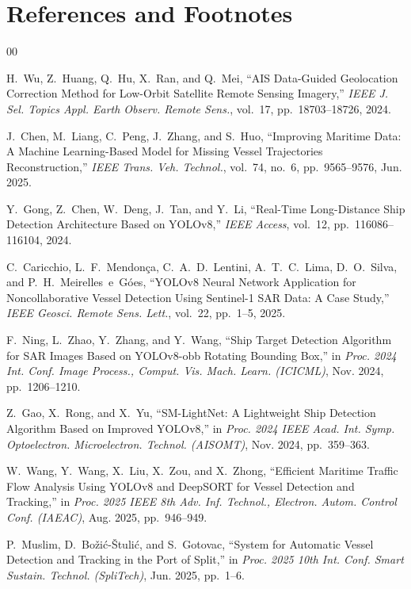 \documentclass{ieeeaccess}
\begin{document}
\section*{References and Footnotes}
\begin{thebibliography}{00}


H.~Wu, Z.~Huang, Q.~Hu, X.~Ran, and Q.~Mei,
``AIS Data-Guided Geolocation Correction Method for Low-Orbit Satellite
Remote Sensing Imagery,''
\emph{IEEE J. Sel. Topics Appl. Earth Observ. Remote Sens.},
vol.~17, pp.~18703--18726, 2024.

J.~Chen, M.~Liang, C.~Peng, J.~Zhang, and S.~Huo,
``Improving Maritime Data: A Machine Learning-Based Model for Missing
Vessel Trajectories Reconstruction,''
\emph{IEEE Trans. Veh. Technol.},
vol.~74, no.~6, pp.~9565--9576, Jun. 2025.

Y.~Gong, Z.~Chen, W.~Deng, J.~Tan, and Y.~Li,
``Real-Time Long-Distance Ship Detection Architecture Based on YOLOv8,''
\emph{IEEE Access},
vol.~12, pp.~116086--116104, 2024.

C.~Caricchio, L.~F.~Mendon\c{c}a, C.~A.~D.~Lentini,
A.~T.~C.~Lima, D.~O.~Silva, and P.~H.~Meirelles~e~G\'{o}es,
``YOLOv8 Neural Network Application for Noncollaborative Vessel Detection
Using Sentinel-1 SAR Data: A Case Study,''
\emph{IEEE Geosci. Remote Sens. Lett.},
vol.~22, pp.~1--5, 2025.

F.~Ning, L.~Zhao, Y.~Zhang, and Y.~Wang,
``Ship Target Detection Algorithm for SAR Images Based on YOLOv8-obb
Rotating Bounding Box,''
in \emph{Proc. 2024 Int. Conf. Image Process., Comput. Vis. Mach. Learn.
(ICICML)}, Nov. 2024, pp.~1206--1210.

Z.~Gao, X.~Rong, and X.~Yu,
``SM-LightNet: A Lightweight Ship Detection Algorithm Based on
Improved YOLOv8,''
in \emph{Proc. 2024 IEEE Acad. Int. Symp. Optoelectron. Microelectron.
Technol. (AISOMT)}, Nov. 2024, pp.~359--363.

W.~Wang, Y.~Wang, X.~Liu, X.~Zou, and X.~Zhong,
``Efficient Maritime Traffic Flow Analysis Using YOLOv8 and DeepSORT
for Vessel Detection and Tracking,''
in \emph{Proc. 2025 IEEE 8th Adv. Inf. Technol., Electron. Autom.
Control Conf. (IAEAC)}, Aug. 2025, pp.~946--949.

P.~Muslim, D.~Bo\v{z}i\'{c}-\v{S}tuli\'{c}, and S.~Gotovac,
``System for Automatic Vessel Detection and Tracking in the
Port of Split,''
in \emph{Proc. 2025 10th Int. Conf. Smart Sustain. Technol.
(SpliTech)}, Jun. 2025, pp.~1--6.


\end{thebibliography}
\end{document}
